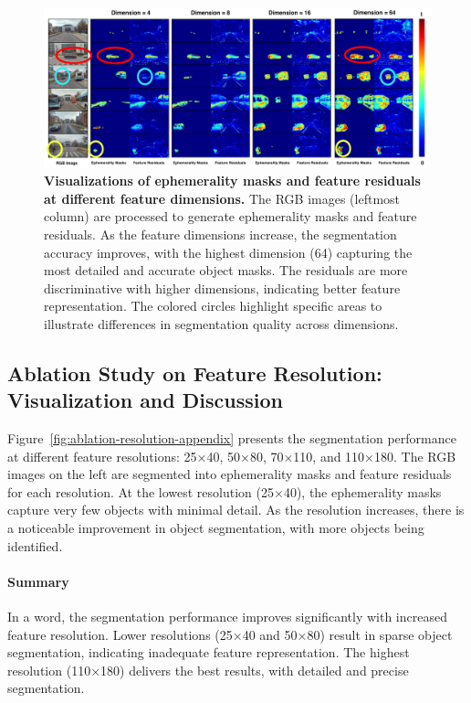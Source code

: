 \begin{figure}[ht]
\begin{center}
\centerline{\includegraphics[width=\columnwidth]{figs_compressed/ablation-dimension_compressed.pdf}}
\caption{\textbf{Visualizations of ephemerality masks and feature residuals at different feature dimensions.} The RGB images (leftmost column) are processed to generate ephemerality masks and feature residuals. As the feature dimensions increase, the segmentation accuracy improves, with the highest dimension (64) capturing the most detailed and accurate object masks. The residuals are more discriminative with higher dimensions, indicating better feature representation. The colored circles highlight specific areas to illustrate differences in segmentation quality across dimensions.}
\label{fig:ablation-dimension-appendix}
\end{center}
\end{figure}

\clearpage




\subsection{Ablation Study on Feature Resolution: Visualization and Discussion}

Figure~\ref{fig:ablation-resolution-appendix} presents the segmentation performance at different feature resolutions: 25×40, 50×80, 70×110, and 110×180. The RGB images on the left are segmented into ephemerality masks and feature residuals for each resolution. At the lowest resolution (25×40), the ephemerality masks capture very few objects with minimal detail. As the resolution increases, there is a noticeable improvement in object segmentation, with more objects being identified. 

\paragraph{Summary} In a word, the segmentation performance improves significantly with increased feature resolution. Lower resolutions (25×40 and 50×80) result in sparse object segmentation, indicating inadequate feature representation. The highest resolution (110×180) delivers the best results, with detailed and precise segmentation. 

